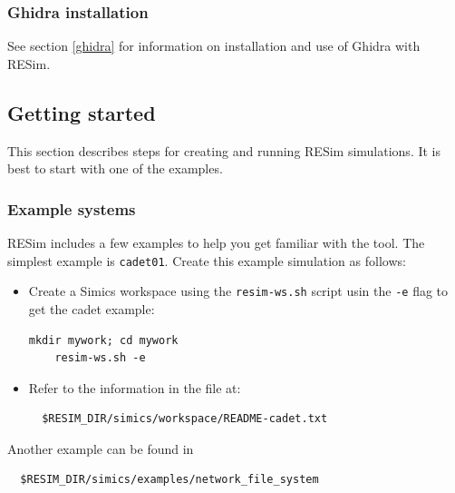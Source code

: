 \documentclass[titlepage]{article}
\begin{document}
\subsubsection{Ghidra installation}
See section \ref{ghidra} for information on installation and use of Ghidra with RESim.

\subsection{Getting started}
\label{getting-started}
This section describes steps for creating and running RESim simulations.
It is best to start with one of the examples.

\subsubsection{Example systems}
RESim includes a few examples to help you get familiar with the tool.  
The simplest example is {\tt cadet01}.  Create this example simulation as follows:
\begin{itemize}
\item Create a Simics workspace using the {\tt resim-ws.sh} script usin the {\tt -e} flag to get the cadet example:
\begin{verbatim}
mkdir mywork; cd mywork
    resim-ws.sh -e
\end{verbatim}
\item Refer to the information in the file at:
\begin{verbatim}
  $RESIM_DIR/simics/workspace/README-cadet.txt
\end{verbatim}
\end{itemize}

Another example can be found in
\begin{verbatim}
  $RESIM_DIR/simics/examples/network_file_system
\end{verbatim}
\end{document}
